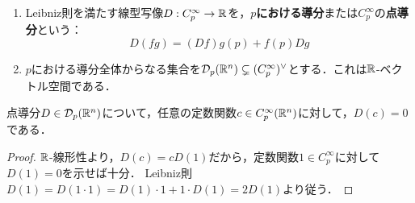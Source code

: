 \documentclass[uplatex,dvipdfmx]{jsreport}
\begin{document}
\begin{definition}[derivatice]\mbox{}
    \begin{enumerate}
        \item Leibniz則を満たす線型写像$D:C^\infty_p\to\mathbb{R}$を，\textbf{$p$における導分}または$C^\infty_p$の\textbf{点導分}という：
        \[D(fg)=(Df)g(p)+f(p)Dg\]
        \item $p$における導分全体からなる集合を$\mathcal{D}_p(\mathbb{R}^n)\subsetneq(C_p^\infty)^\vee$とする．これは$\mathbb{R}$-ベクトル空間である．
    \end{enumerate}
\end{definition}

\begin{lemma}\label{lemma-differential-of-constant-function}
    点導分$D\in\mathcal{D}_p(\mathbb{R}^n)$について，任意の定数関数$c\in C^\infty_p(\mathbb{R}^n)$に対して，$D(c)=0$である．
\end{lemma}
\begin{proof}
    $\mathbb{R}$-線形性より，$D(c)=cD(1)$だから，定数関数$1\in C^\infty_p$に対して$D(1)=0$を示せば十分．
    Leibniz則$D(1)=D(1\cdot 1)=D(1)\cdot 1+1\cdot D(1)=2D(1)$より従う．
\end{proof}
\end{document}
